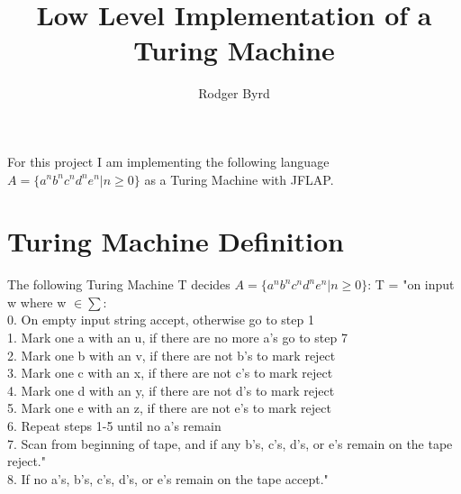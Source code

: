 \documentclass{article}
\begin{document}
\raggedright
\doublespacing

\title{Low Level Implementation of a Turing Machine}
\author{Rodger Byrd}
\maketitle
For this project I am implementing the following language $A=\{a^{n}b^{n}c^{n}d^{n}e^{n} \vert n \geq 0\}$ as a Turing Machine with JFLAP\cite{jflap}.

\section{Turing Machine Definition}
The following Turing Machine T decides $A=\{a^{n}b^{n}c^{n}d^{n}e^{n} \vert n \geq 0\}$:\break
T = "on input w where w $ \in \sum$:\\
\hspace{20 pt} 0. On empty input string accept, otherwise go to step 1\\
\hspace{20 pt} 1. Mark one a with an u, if there are no more a's go to step 7\\
\hspace{20 pt} 2. Mark one b with an v, if there are not b's to mark reject\\
\hspace{20 pt} 3. Mark one c with an x, if there are not c's to mark reject\\
\hspace{20 pt} 4. Mark one d with an y, if there are not d's to mark reject\\
\hspace{20 pt} 5. Mark one e with an z, if there are not e's to mark reject\\
\hspace{20 pt} 6. Repeat steps 1-5 until no a's remain\\
\hspace{20 pt} 7. Scan from beginning of tape, and if any b's, c's, d's, or e's remain on the tape reject."\\
\hspace{20 pt} 8. If no a's, b's, c's, d's, or e's remain on the tape accept."
\end{document}
